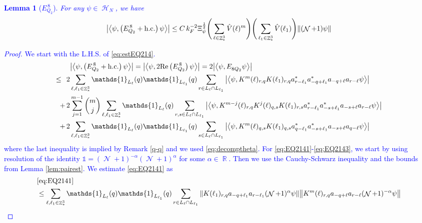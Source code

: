\documentclass[sn-mathphys, Numbered ,a4paper]{sn-jnl}%
\DeclareMathOperator{\R}{\mathbb{R}}
\DeclareMathOperator{\Z}{\mathbb{Z}}
\DeclareMathOperator{\HH}{\mathcal{H}}
\DeclareMathOperator{\NN}{\mathcal{N}}
\newcommand{\half}{\frac{1}{2}}
\newcommand{\eva}[1]{\left\langle #1 \right\rangle}
\theoremstyle{plain}
\newtheorem{lemma}[theorem]{Lemma}
\theoremstyle{definition}
\theoremstyle{remark}
\theoremstyle{plain}
\theoremstyle{definition}
\theoremstyle{remark}
\begin{document}
\textcolor{blue}{
	\begin{lemma}[$E_{Q_2}^{\,8}$]\label{lem:EQ214}
		For any $\psi \in \HH_N$, we have
		\begin{align}
			\abs{\eva{\psi,\left(E^{\,8}_{Q_2}+\mathrm{h.c.}\right) \psi }}
			\leq  C\, k_{F}^{-2} \Xi_{\psi}^{\half} \Bigg(\sum\limits_{\ell \in \Z^3_*} \hat{V}(\ell)^m \Bigg) \Bigg( \sum\limits_{\ell_1 \in \Z^3_*}\hat{V}(\ell_1) \Bigg)  \norm { (\NN+1) \psi } \label{eq:estEQ214}
		\end{align}
	\end{lemma}
	\begin{proof}
		We start with the L.H.S. of \eqref{eq:estEQ214}.
		\begin{align}
			&\abs{\eva{\psi,\left(E^{\,8}_{Q_2}+\mathrm{h.c.}\right) \psi }} = \abs{\eva{\psi,2\mathrm{Re}\left(E^{\,8}_{Q_2}\right) \psi }} = 2\abs{\eva{\psi, E^{\,}_{8Q_2} \psi }}\nonumber\\
			\leq\,\;2& \sum\limits_{\ell, \ell_1\in \Z^3_*} \mathds{1}_{L_{\ell}}(q) \mathds{1}_{L_{\ell_1}}(q) \sum\limits_{r\in L_{\ell} \cap L_{\ell_1}} \abs{\eva{\psi,  K^m(\ell)_{r,q}K(\ell_1)_{r,q}a^*_{r-\ell_1}a^*_{-q+\ell_1} a_{-q+\ell}a_{r-\ell} \psi }}\label{eq:EQ2141}\\
			+\,2& \sum\limits_{j=1}^{m-1} {{m}\choose j} \sum\limits_{\ell, \ell_1\in \Z^3_*}\mathds{1}_{L_{\ell}}(q) \sum\limits_{r,s \in L_{\ell} \cap L_{\ell_1}}  \abs{\eva{\psi, K^{m-j}(\ell)_{r,q} K^{j}(\ell)_{q,s} K(\ell_1)_{r,s} a^*_{r-\ell_1} a^*_{-s+\ell_1} a_{-s+\ell} a_{r-\ell} \psi }} \label{eq:EQ2142}\\
			+\,2&\sum\limits_{\ell, \ell_1\in \Z^3_*} \mathds{1}_{L_{\ell}}(q) \mathds{1}_{L_{\ell_1}}(q) \sum\limits_{s \in L_{\ell} \cap L_{\ell_1}} \abs{\eva{\psi,  K^m(\ell)_{q,s}K(\ell_1)_{q,s}a^*_{q-\ell_1}a^*_{-s+\ell_1} a_{-s+\ell}a_{q-\ell} \psi }}\label{eq:EQ2143}
		\end{align}
		where the last inequality is implied by Remark \ref{q-q} and we used \eqref{eq:decomptheta}.
		For \eqref{eq:EQ2141}-\eqref{eq:EQ2143}, we start by using resolution of the identity $\mathds{1} = (\NN+1)^{-\alpha}(\NN+1)^{\alpha}$ for some $\alpha \in \R$. Then we use the Cauchy-Schwarz inequality and the bounds from Lemma \ref{lem:pairest}.
		We estimate \eqref{eq:EQ2141} as 
		\begin{align}
			&\eqref{eq:EQ2141}\nonumber\\
			&\leq \sum\limits_{\ell, \ell_1\in \Z^3_*} \mathds{1}_{L_{\ell}}(q) \mathds{1}_{L_{\ell_1}}(q) \sum\limits_{r\in L_{\ell} \cap L_{\ell_1}} \norm{ K(\ell_1)_{r,q} a_{-q+\ell_1} a_{r-\ell_1}(\NN+1)^{\alpha}\psi}\norm{ K^m(\ell)_{r,q} a_{-q+\ell}a_{r-\ell} (\NN+1)^{-\alpha} \psi }\nonumber\\

\end{align}
\end{proof}}
\end{document}
